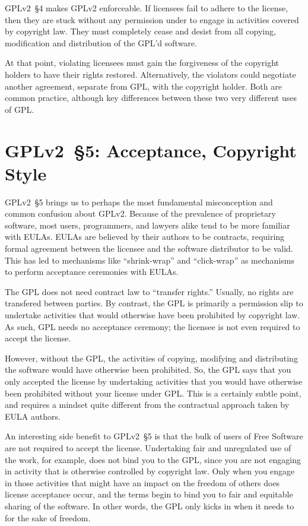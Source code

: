 GPLv2~\S4 makes GPLv2 enforceable.  If licensees fail to adhere to the
license, then they are stuck without any permission under to engage in
activities covered by copyright law.  They must completely cease and desist
from all copying, modification and distribution of the GPL'd software.

At that point, violating licensees must gain the forgiveness of the copyright
holders to have their rights restored.  Alternatively, the violators could
negotiate another agreement, separate from GPL, with the copyright
holder.  Both are common practice, although
 key differences between these two very different uses of GPL.

\section{GPLv2~\S5: Acceptance, Copyright Style}
\label{GPLv2s5}

GPLv2~\S5 brings us to perhaps the most fundamental misconception and common
confusion about GPLv2\@. Because of the prevalence of proprietary software,
most users, programmers, and lawyers alike tend to be more familiar with
EULAs. EULAs are believed by their authors to be contracts, requiring
formal agreement between the licensee and the software distributor to be
valid. This has led to mechanisms like ``shrink-wrap'' and ``click-wrap''
as mechanisms to perform acceptance ceremonies with EULAs.

The GPL does not need contract law to ``transfer rights.''  Usually, no rights
are transfered between parties.  By contrast, the GPL is primarily a permission
slip to undertake activities that would otherwise have been prohibited
by copyright law.  As such, GPL needs no acceptance ceremony; the
licensee is not even required to accept the license.

However, without the GPL, the activities of copying, modifying and
distributing the software would have otherwise been prohibited.  So, the
GPL says that you only accepted the license by undertaking activities that
you would have otherwise been prohibited without your license under GPL\@.
This is a certainly subtle point, and requires a mindset quite different
from the contractual approach taken by EULA authors.

An interesting side benefit to GPLv2~\S5 is that the bulk of users of Free
Software are not required to accept the license.  Undertaking fair and
unregulated use of the work, for example, does not bind you to the GPL,
since you are not engaging in activity that is otherwise controlled by
copyright law.  Only when you engage in those activities that might have an
impact on the freedom of others does license acceptance occur, and the
terms begin to bind you to fair and equitable sharing of the software.  In
other words, the GPL only kicks in when it needs to for the sake of
freedom.


